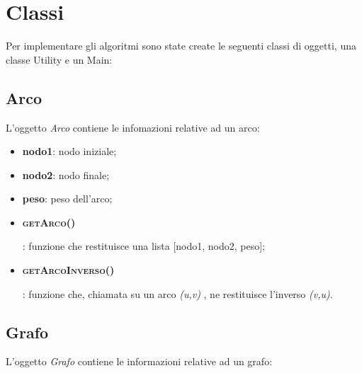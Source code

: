 \section{Classi}
\label{Classi}

Per implementare gli algoritmi sono state create le seguenti classi di oggetti, una classe Utility e un Main:

\subsection{Arco}
\label{arco}

L'oggetto \textit{Arco} contiene le infomazioni relative ad un arco:

\begin{itemize}
    \item \textbf{nodo1}: nodo iniziale;
    \item \textbf{nodo2}: nodo finale;
    \item \textbf{peso}: peso dell'arco;
    \item \hypertarget{getarco}{\textbf{\textsc{getArco()}}}: funzione che restituisce una lista [nodo1, nodo2, peso];
    \item \hypertarget{getarcoinverso}{\textbf{\textsc{getArcoInverso()}}}: funzione che, chiamata su un arco \emph{(u,v)} , ne restituisce l'inverso \emph{(v,u)}.
\end{itemize}


\subsection{Grafo}
\label{grafo}

L'oggetto \textit{Grafo} contiene le informazioni relative ad un grafo:

